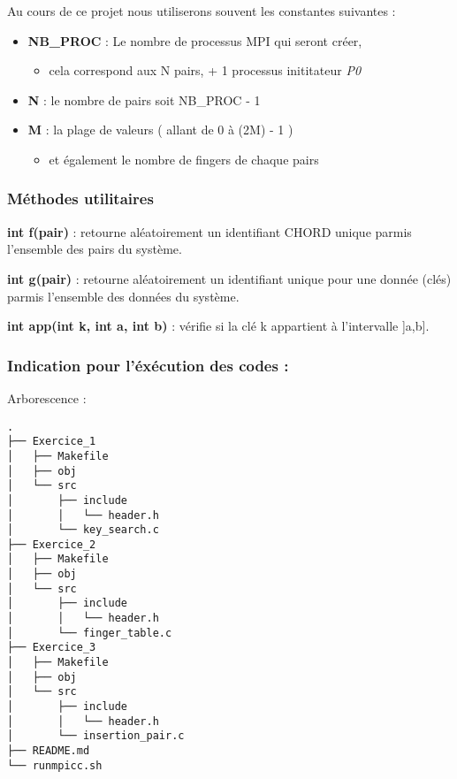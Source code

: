 \documentclass[
]{article}
\providecommand{\tightlist}{%
  \setlength{\itemsep}{0pt}\setlength{\parskip}{0pt}}
\begin{document}
Au cours de ce projet nous utiliserons souvent les constantes suivantes
:

\begin{itemize}
\item
  \textbf{NB\_PROC} : Le nombre de processus MPI qui seront créer,

  \begin{itemize}
  \tightlist
  \item
    cela correspond aux N pairs, + 1 processus inititateur \emph{P0}
  \end{itemize}
\item
  \textbf{N} : le nombre de pairs soit NB\_PROC - 1
\item
  \textbf{M} : la plage de valeurs ( allant de 0 à (2M) - 1 )

  \begin{itemize}
  \tightlist
  \item
    et également le nombre de fingers de chaque pairs
  \end{itemize}
\end{itemize}

\hypertarget{muxe9thodes-utilitaires}{%
\subsubsection{Méthodes utilitaires}\label{muxe9thodes-utilitaires}}

\textbf{int f(pair)} : retourne aléatoirement un identifiant CHORD
unique parmis l'ensemble des pairs du système.

\textbf{int g(pair)} : retourne aléatoirement un identifiant unique pour
une donnée (clés) parmis l'ensemble des données du système.

\textbf{int app(int k, int a, int b)} : vérifie si la clé k appartient à
l'intervalle {]}a,b{]}.

\hypertarget{indication-pour-luxe9xuxe9cution-des-codes}{%
\subsubsection{Indication pour l'éxécution des codes
:}\label{indication-pour-luxe9xuxe9cution-des-codes}}

Arborescence :

\begin{verbatim}
.
├── Exercice_1
│   ├── Makefile
│   ├── obj
│   └── src
│       ├── include
│       │   └── header.h
│       └── key_search.c
├── Exercice_2
│   ├── Makefile
│   ├── obj
│   └── src
│       ├── include
│       │   └── header.h
│       └── finger_table.c
├── Exercice_3
│   ├── Makefile
│   ├── obj
│   └── src
│       ├── include
│       │   └── header.h
│       └── insertion_pair.c
├── README.md
└── runmpicc.sh
\end{verbatim}
\end{document}
